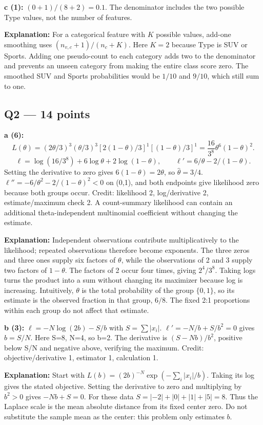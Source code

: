 \documentclass[11pt]{article}
\begin{document}
\textbf{c (1):} $(0+1)/(8+2)=0.1$. The denominator includes the two possible Type values, not the number of features.

\textbf{Explanation:} For a categorical feature with $K$ possible values, add-one smoothing uses $(n_{v,c}+1)/(n_c+K)$. Here $K=2$ because Type is SUV or Sports. Adding one pseudo-count to each category adds two to the denominator and prevents an unseen category from making the entire class score zero. The smoothed SUV and Sports probabilities would be $1/10$ and $9/10$, which still sum to one.


\subsection*{Q2 — 14 points}

\textbf{a (6):}
\[
L(\theta)=(2\theta/3)^3(\theta/3)^3[2(1-\theta)/3]^1[(1-\theta)/3]^1=\frac{16}{3^8}\theta^6(1-\theta)^2.
\]
\[
\ell=\log(16/3^8)+6\log\theta+2\log(1-\theta),\qquad \ell'=6/\theta-2/(1-\theta).
\]
Setting the derivative to zero gives $6(1-\theta)=2\theta$, so $\hat\theta=3/4$. $\ell''=-6/\theta^2-2/(1-\theta)^2<0$ on (0,1), and both endpoints give likelihood zero because both groups occur. Credit: likelihood 2, log/\allowbreak{}derivative 2, estimate/\allowbreak{}maximum check 2. A count-summary likelihood can contain an additional theta-independent multinomial coefficient without changing the estimate.

\textbf{Explanation:} Independent observations contribute multiplicatively to the likelihood; repeated observations therefore become exponents. The three zeros and three ones supply six factors of $\theta$, while the observations of 2 and 3 supply two factors of $1-\theta$. The factors of 2 occur four times, giving $2^4/3^8$. Taking logs turns the product into a sum without changing its maximizer because log is increasing. Intuitively, $\theta$ is the total probability of the group $\{0,1\}$, so its estimate is the observed fraction in that group, $6/8$. The fixed 2:1 proportions within each group do not affect that estimate.

\textbf{b (3):} $\ell=-N\log(2b)-S/b$ with $S=\sum|x_i|$. $\ell'=-N/b+S/b^2=0$ gives $\hat b=S/N$. Here S=8, N=4, so b=2. The derivative is $(S-Nb)/b^2$, positive below S/\allowbreak{}N and negative above, verifying the maximum. Credit: objective/\allowbreak{}derivative 1, estimator 1, calculation 1.

\textbf{Explanation:} Start with $L(b)=(2b)^{-N}\exp(-\sum_i|x_i|/b)$. Taking its log gives the stated objective. Setting the derivative to zero and multiplying by $b^2>0$ gives $-Nb+S=0$. For these data $S=|-2|+|0|+|1|+|5|=8$. Thus the Laplace scale is the mean absolute distance from its fixed center zero. Do not substitute the sample mean as the center: this problem only estimates $b$.
\end{document}

